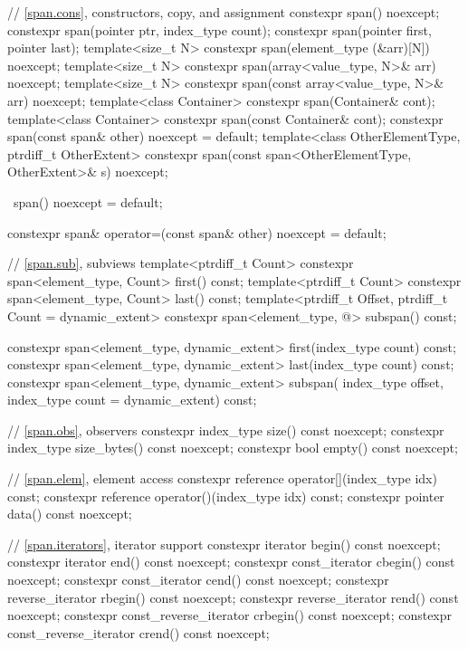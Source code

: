 \begin{codeblock}
\begin{codeblock}
\begin{codeblock}
\begin{codeblock}
{{    // \ref{span.cons}, constructors, copy, and assignment
    constexpr span() noexcept;
    constexpr span(pointer ptr, index_type count);
    constexpr span(pointer first, pointer last);
    template<size_t N>
      constexpr span(element_type (&arr)[N]) noexcept;
    template<size_t N>
      constexpr span(array<value_type, N>& arr) noexcept;
    template<size_t N>
      constexpr span(const array<value_type, N>& arr) noexcept;
    template<class Container>
      constexpr span(Container& cont);
    template<class Container>
      constexpr span(const Container& cont);
    constexpr span(const span& other) noexcept = default;
    template<class OtherElementType, ptrdiff_t OtherExtent>
      constexpr span(const span<OtherElementType, OtherExtent>& s) noexcept;

    ~span() noexcept = default;

    constexpr span& operator=(const span& other) noexcept = default;

    // \ref{span.sub}, subviews
    template<ptrdiff_t Count>
      constexpr span<element_type, Count> first() const;
    template<ptrdiff_t Count>
      constexpr span<element_type, Count> last() const;
    template<ptrdiff_t Offset, ptrdiff_t Count = dynamic_extent>
      constexpr span<element_type, @\seebelow@> subspan() const;

    constexpr span<element_type, dynamic_extent> first(index_type count) const;
    constexpr span<element_type, dynamic_extent> last(index_type count) const;
    constexpr span<element_type, dynamic_extent> subspan(
      index_type offset, index_type count = dynamic_extent) const;

    // \ref{span.obs}, observers
    constexpr index_type size() const noexcept;
    constexpr index_type size_bytes() const noexcept;
    constexpr bool empty() const noexcept;

    // \ref{span.elem}, element access
    constexpr reference operator[](index_type idx) const;
    constexpr reference operator()(index_type idx) const;
    constexpr pointer data() const noexcept;

    // \ref{span.iterators}, iterator support
    constexpr iterator begin() const noexcept;
    constexpr iterator end() const noexcept;
    constexpr const_iterator cbegin() const noexcept;
    constexpr const_iterator cend() const noexcept;
    constexpr reverse_iterator rbegin() const noexcept;
    constexpr reverse_iterator rend() const noexcept;
    constexpr const_reverse_iterator crbegin() const noexcept;
    constexpr const_reverse_iterator crend() const noexcept;

}}
\end{codeblock}
\end{codeblock}
\end{codeblock}
\end{codeblock}
